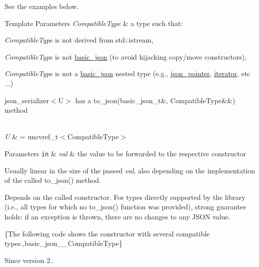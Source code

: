 See the examples below.


\begin{DoxyTemplParams}{Template Parameters}
{\em Compatible\+Type} & a type such that\+:
\begin{DoxyItemize}
\item {\itshape Compatible\+Type} is not derived from {\ttfamily std\+::istream},
\item {\itshape Compatible\+Type} is not \mbox{\hyperlink{classnlohmann_1_1basic__json}{basic\+\_\+json}} (to avoid hijacking copy/move constructors),
\item {\itshape Compatible\+Type} is not a \mbox{\hyperlink{classnlohmann_1_1basic__json}{basic\+\_\+json}} nested type (e.\+g., \mbox{\hyperlink{classnlohmann_1_1json__pointer}{json\+\_\+pointer}}, \mbox{\hyperlink{classnlohmann_1_1basic__json_a099316232c76c034030a38faa6e34dca}{iterator}}, etc ...)
\item json\+\_\+serializer$<$\+U$>$ has a {\ttfamily to\+\_\+json(basic\+\_\+json\+\_\+t\&, Compatible\+Type\&\&)} method
\end{DoxyItemize}\\
\hline
{\em U} & = {\ttfamily uncvref\+\_\+t$<$Compatible\+Type$>$}\\
\hline
\end{DoxyTemplParams}

\begin{DoxyParams}[1]{Parameters}
\mbox{\tt in}  & {\em val} & the value to be forwarded to the respective constructor\\
\hline
\end{DoxyParams}
Usually linear in the size of the passed {\itshape val}, also depending on the implementation of the called {\ttfamily to\+\_\+json()} method.

Depends on the called constructor. For types directly supported by the library (i.\+e., all types for which no {\ttfamily to\+\_\+json()} function was provided), strong guarantee holds\+: if an exception is thrown, there are no changes to any J\+S\+ON value.

\{The following code shows the constructor with several compatible types.,basic\+\_\+json\+\_\+\+\_\+\+Compatible\+Type\}

\begin{DoxySince}{Since}
version 2.. 
\end{DoxySince}
\mbox{\label{classnlohmann_1_1basic__json_ab5dfd9a2b2663b219641cb7fe59b6da2}} 
